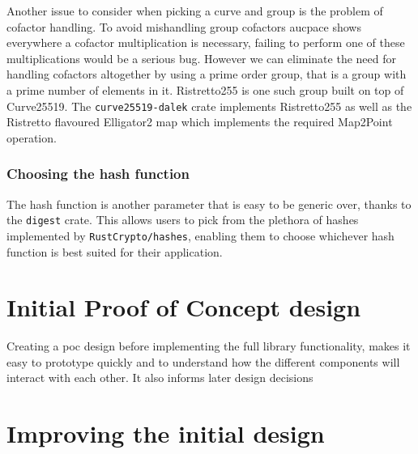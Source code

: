 Another issue to consider when picking a curve and group is the problem of cofactor handling.
To avoid mishandling group cofactors \gls{aucpace} shows everywhere a cofactor multiplication is necessary, failing to perform one of these multiplications would be a serious bug.
However we can eliminate the need for handling cofactors altogether by using a prime order group, that is a group with a prime number of elements in it.
Ristretto255 \cite{ristretto255} is one such group built on top of Curve25519.
The \texttt{curve25519-dalek} crate implements Ristretto255 as well as the Ristretto flavoured Elligator2 map \cite{elligator2} which implements the required \textsf{Map2Point} operation.

\subsubsection{Choosing the hash function}
The hash function is another parameter that is easy to be generic over, thanks to the \texttt{digest} crate.
This allows users to pick from the plethora of hashes implemented by \texttt{RustCrypto/hashes}, enabling them to choose whichever hash function is best suited for their application.

\section{Initial Proof of Concept design}
Creating a \gls{poc} design before implementing the full library functionality, makes it easy to prototype quickly and to understand how the different components will interact with each other.
It also informs later design decisions 

\section{Improving the initial design}



